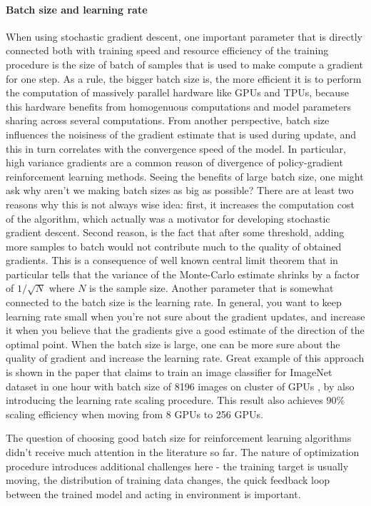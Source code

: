 \paragraph{Batch size and learning rate}
When using stochastic gradient descent, one important parameter that is directly connected both
with training speed and resource efficiency of the training procedure is the size of batch of
samples that is used to make compute a gradient for one step. As a rule, the bigger batch size
is, the more efficient it is to perform the computation of massively parallel hardware like
GPUs and TPUs, because this hardware benefits from homogenuous computations and model parameters
sharing across several computations. From another perspective, batch size influences the noisiness
of the gradient estimate that is used during update, and this in turn correlates with the
convergence speed of the model. In particular, high variance gradients are a common reason of
divergence of policy-gradient reinforcement learning methods. Seeing the benefits of large batch
size, one might ask why aren't we making batch sizes as big as possible? There are at least two
reasons why this is not always wise idea: first, it increases the computation cost of the
algorithm, which actually was a motivator for developing stochastic gradient descent. Second
reason, is the fact that after some threshold, adding more samples to batch would not contribute
much to the quality of obtained gradients. This is a consequence of well known central limit
theorem that in particular tells that the variance of the Monte-Carlo estimate shrinks by a factor
of $1/\sqrt{N}$ where $N$ is the sample size.
Another parameter that is somewhat connected to the batch size is the learning rate. In general,
you want to keep learning rate small when you're not sure about the gradient updates, and increase
it when you believe that the gradients give a good estimate of the direction of the optimal point.
When the batch size is large, one can be more sure about the quality of gradient and increase the
learning rate. Great example of this approach is shown in the paper that claims to train an image
classifier for ImageNet dataset in one hour with batch size of 8196 images on cluster of GPUs
\cite{goyal2017accurate}, by also introducing the learning rate scaling procedure. This result also
achieves 90\% scaling efficiency when moving from 8 GPUs to 256 GPUs.

The question of choosing good batch size for reinforcement learning algorithms didn't receive
much attention in the literature so far. The nature of optimization procedure introduces additional
challenges here - the training target is usually moving, the distribution of training data changes,
the quick feedback loop between the trained model and acting in environment is important.

